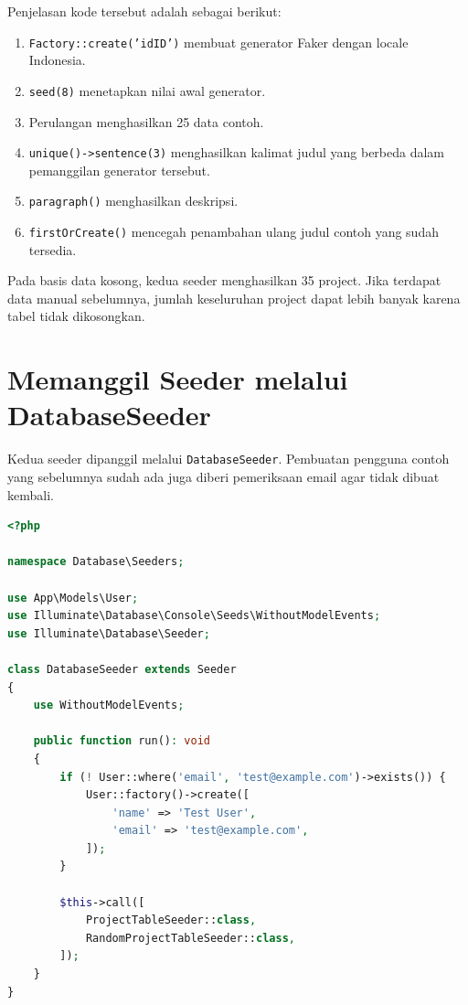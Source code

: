 \documentclass[a4paper,oneside,11pt]{book}
\renewcommand{\_}{\textunderscore\allowbreak{}}
\begin{document}
Penjelasan kode tersebut adalah sebagai berikut:

\begin{enumerate}
    \item \texttt{Factory::create('id\_ID')} membuat generator Faker dengan locale Indonesia.
    \item \texttt{seed(8)} menetapkan nilai awal generator.
    \item Perulangan menghasilkan 25 data contoh.
    \item \texttt{unique()->sentence(3)} menghasilkan kalimat judul yang berbeda dalam pemanggilan generator tersebut.
    \item \texttt{paragraph()} menghasilkan deskripsi.
    \item \texttt{firstOrCreate()} mencegah penambahan ulang judul contoh yang sudah tersedia.
\end{enumerate}

Pada basis data kosong, kedua seeder menghasilkan 35 project.
Jika terdapat data manual sebelumnya, jumlah keseluruhan project dapat
lebih banyak karena tabel tidak dikosongkan.

\section{Memanggil Seeder melalui DatabaseSeeder}

Kedua seeder dipanggil melalui \texttt{DatabaseSeeder}.
Pembuatan pengguna contoh yang sebelumnya sudah ada juga diberi
pemeriksaan email agar tidak dibuat kembali.

\begin{lstlisting}[language=PHP,caption={DatabaseSeeder.php}]
<?php

namespace Database\Seeders;

use App\Models\User;
use Illuminate\Database\Console\Seeds\WithoutModelEvents;
use Illuminate\Database\Seeder;

class DatabaseSeeder extends Seeder
{
    use WithoutModelEvents;

    public function run(): void
    {
        if (! User::where('email', 'test@example.com')->exists()) {
            User::factory()->create([
                'name' => 'Test User',
                'email' => 'test@example.com',
            ]);
        }

        $this->call([
            ProjectTableSeeder::class,
            RandomProjectTableSeeder::class,
        ]);
    }
}
\end{lstlisting}
\end{document}
